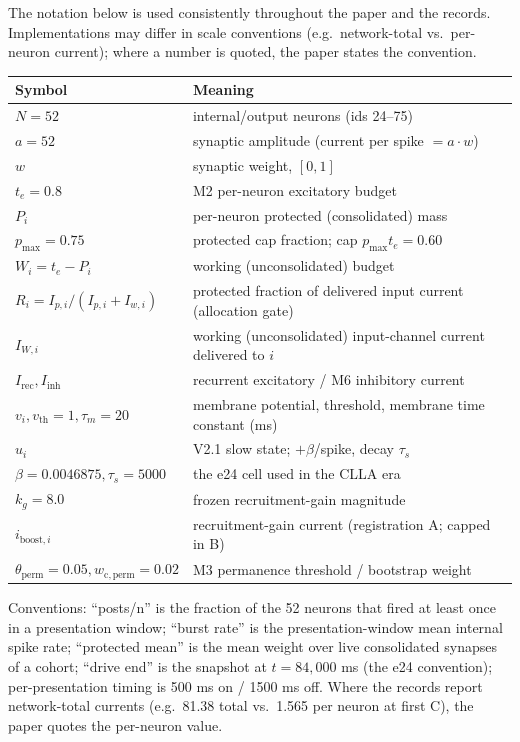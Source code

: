 The notation below is used consistently throughout the paper and the
records. Implementations may differ in scale conventions (e.g.\
network-total vs.\ per-neuron current); where a number is quoted, the
paper states the convention.

\begin{center}
\small
\begin{tabular}{ll}
\toprule
Symbol & Meaning \\
\midrule
\(N = 52\) & internal/output neurons (ids 24--75) \\
\(a = 52\) & synaptic amplitude (current per spike \(= a\cdot w\)) \\
\(w\) & synaptic weight, \([0,1]\) \\
\(t_e = 0.8\) & M2 per-neuron excitatory budget \\
\(P_i\) & per-neuron protected (consolidated) mass \\
\(p_{\max} = 0.75\) & protected cap fraction; cap \(p_{\max} t_e = 0.60\) \\
\(W_i = t_e - P_i\) & working (unconsolidated) budget \\
\(R_i = I_{p,i}/(I_{p,i}+I_{w,i})\) & protected fraction of delivered input current (allocation gate) \\
\(I_{W,i}\) & working (unconsolidated) input-channel current delivered to \(i\) \\
\(I_{\mathrm{rec}}, I_{\mathrm{inh}}\) & recurrent excitatory / M6 inhibitory current \\
\(v_i, v_{\mathrm{th}}=1, \tau_m=20\) & membrane potential, threshold, membrane time constant (ms) \\
\(u_i\) & V2.1 slow state; \(+\beta\)/spike, decay \(\tau_s\) \\
\(\beta = 0.0046875, \tau_s = 5000\) & the e24 cell used in the CLLA era \\
\(k_g = 8.0\) & frozen recruitment-gain magnitude \\
\(i_{\mathrm{boost},i}\) & recruitment-gain current (registration A; capped in B) \\
\(\theta_{\mathrm{perm}} = 0.05, w_{\mathrm{c,perm}} = 0.02\) & M3 permanence threshold / bootstrap weight \\
\end{tabular}
\end{center}

Conventions: ``posts/n'' is the fraction of the 52 neurons that fired
at least once in a presentation window; ``burst rate'' is the
presentation-window mean internal spike rate; ``protected mean'' is the
mean weight over live consolidated synapses of a cohort; ``drive end''
is the snapshot at \(t=84{,}000\) ms (the e24 convention);
per-presentation timing is 500 ms on / 1500 ms off. Where the records
report network-total currents (e.g.\ 81.38 total vs.\ 1.565 per neuron
at first C), the paper quotes the per-neuron value.